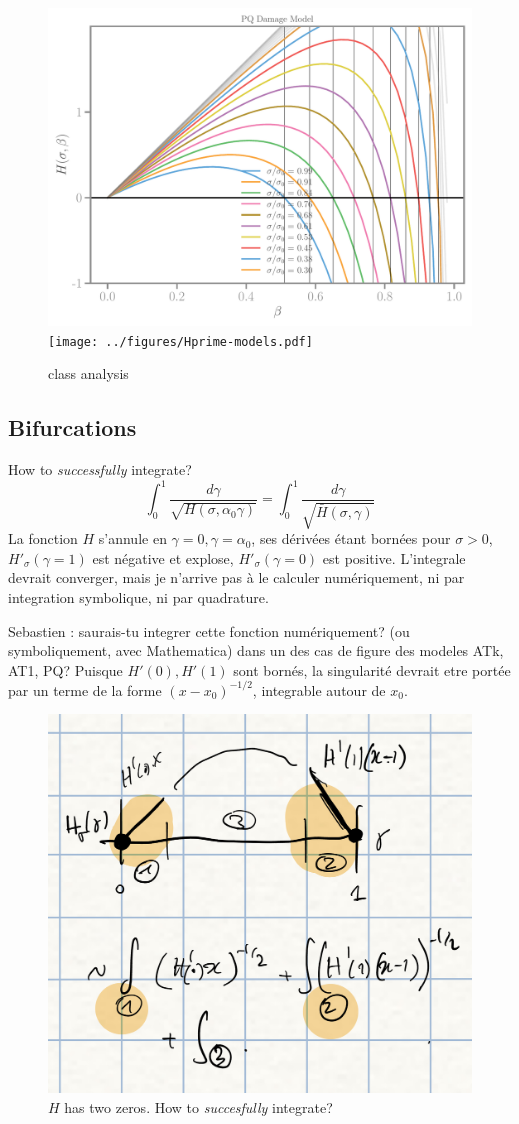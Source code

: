 \documentclass[]{article}
\begin{document}
\begin{figure}[htbp]
  \includegraphics[width=.312\textheight, angle=90]{../figures/pq-Hbeta.pdf}
  \texttt{[image: ../figures/Hprime-models.pdf]}
  \caption{class analysis}
  \label{fig:class-analyser}
\end{figure}


\clearpage

\subsection*{Bifurcations}
How to \emph{successfully} integrate? 
$$ 
\int_0^{1} \frac{d \gamma}{\sqrt{H(\sigma, \alpha_0 \gamma)}} = \int_0^{1} \frac{d \gamma}{\sqrt{\bar H(\sigma,\gamma)}}
$$
La fonction $H$ s'annule en $\gamma=0, \gamma=\alpha_0$, ses dérivées étant bornées pour $\sigma>0$, 
$H'_\sigma(\gamma=1)$ est négative et explose, $H'_\sigma(\gamma=0)$ est positive.
L'integrale devrait converger, mais je n'arrive pas à le calculer numériquement, ni par integration symbolique, ni par quadrature.

Sebastien : saurais-tu integrer cette fonction numériquement? (ou symboliquement, avec Mathematica)
dans un des cas de figure des modeles ATk, AT1, PQ?
Puisque $H'(0), H'(1)$ sont bornés, la singularité devrait etre portée par un terme de la forme $({x-x_0})^{-1/2}$, integrable autour de $x_0$.

\begin{figure}[htbp]
  \begin{center}
  \includegraphics[width=.5\textwidth]{../figures/H-heuristics.jpeg}
  \caption{$H$ has two zeros. How to \emph{succesfully} integrate?}
  \label{fig:class-analyser}
  \end{center}
\end{figure}
\end{document}
